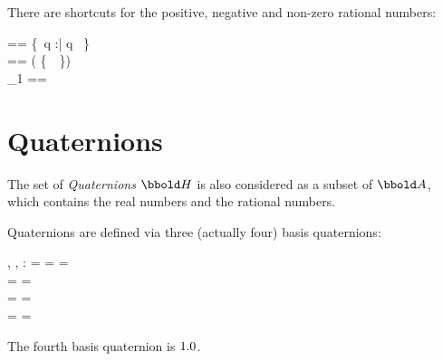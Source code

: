 \documentclass[12pt]{article}
\begin{document}
There are shortcuts for the positive, negative and non-zero rational numbers:
\begin{zed}
  \ratplus == \{~q :\rat | q \agt \azero~\}\\
  \ratminus == \rat \setminus ( \ratplus \cup \{~\azero~\}) \\
  \rat_1 == \ratplus \cup \ratminus \\
\end{zed}
%
\section{Quaternions}
\label{sec:quaternions}
The set of \emph{Quaternions} $\quaternions$ is also considered as a
subset of $\arithmos$, which contains the real numbers and the
rational numbers.

Quaternions are defined via three (actually four) basis quaternions:
%
\begin{axdef}
  \iu, \ju, \ku : \arithmos
  \where
  \iu \amult \iu = \ju \amult \ju = \ku \amult \ku = \aneg \aone\\
  \iu \amult \ju = \aneg \ju \amult \iu = \ku \\
  \ju \amult \ku = \aneg \ku \amult \ju = \iu \\
  \ku \amult \iu = \aneg \iu \amult \ku = \ju
\end{axdef}

The fourth basis quaternion is $1.0$.
\end{document}
